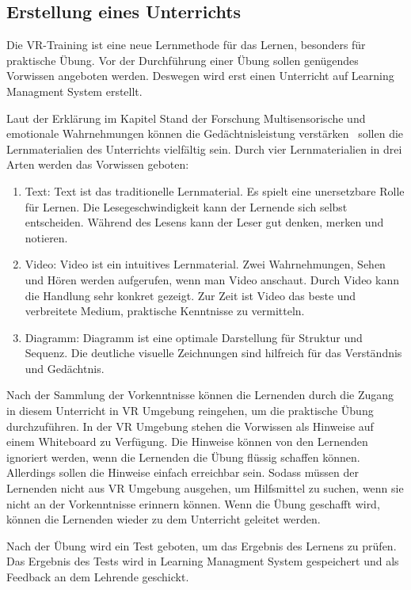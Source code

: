  \subsection{Erstellung eines Unterrichts}
 Die VR-Training ist eine neue Lernmethode für das Lernen, besonders für praktische Übung. Vor der Durchführung einer Übung sollen genügendes Vorwissen angeboten werden. Deswegen wird erst einen Unterricht auf Learning Managment System erstellt.

 Laut der Erklärung im Kapitel Stand der Forschung \glqq Multisensorische und emotionale Wahrnehmungen können die Gedächtnisleistung verstärken\grqq\ \citep{11} sollen die Lernmaterialien des Unterrichts vielfältig sein.  Durch vier Lernmaterialien in drei Arten werden das Vorwissen geboten:
 \begin{enumerate}
    \item Text: Text ist das traditionelle Lernmaterial. Es spielt eine unersetzbare Rolle für Lernen. Die Lesegeschwindigkeit kann der Lernende sich selbst entscheiden. Während des Lesens kann der Leser gut denken, merken und notieren.
    \item Video: Video ist ein intuitives Lernmaterial. Zwei Wahrnehmungen, Sehen und Hören werden aufgerufen, wenn man Video anschaut. Durch Video kann die Handlung sehr konkret gezeigt. Zur Zeit ist Video das beste und verbreitete Medium, praktische Kenntnisse zu vermitteln.
    \item Diagramm: Diagramm ist eine optimale Darstellung für Struktur und Sequenz. Die deutliche visuelle Zeichnungen sind hilfreich für das Verständnis und Gedächtnis.
 \end{enumerate}

 Nach der Sammlung der Vorkenntnisse können die Lernenden durch die Zugang in diesem Unterricht in VR Umgebung reingehen, um die praktische Übung durchzuführen. In der VR Umgebung stehen die Vorwissen als Hinweise auf einem Whiteboard zu Verfügung. Die Hinweise können von den Lernenden ignoriert werden, wenn die Lernenden die Übung flüssig schaffen können. Allerdings sollen die Hinweise einfach erreichbar sein. Sodass müssen der Lernenden nicht aus VR Umgebung ausgehen, um Hilfsmittel zu suchen, wenn sie nicht an der Vorkenntnisse erinnern können. Wenn die Übung geschafft wird, können die Lernenden wieder zu dem Unterricht geleitet werden.

 Nach der Übung wird ein Test geboten, um das Ergebnis des Lernens zu prüfen. Das Ergebnis des Tests wird in Learning Managment System gespeichert und als Feedback an dem Lehrende geschickt.
 
